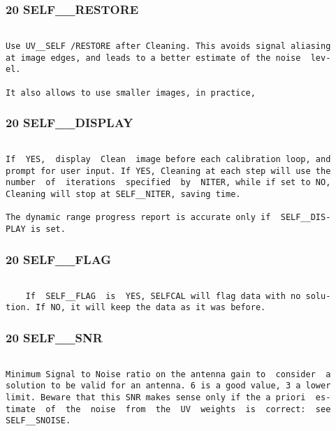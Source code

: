 \subsubsection{20 SELF\_\_RESTORE}
\begin{verbatim}

Use UV__SELF /RESTORE after Cleaning. This avoids signal aliasing
at image edges, and leads to a better estimate of the noise  lev-
el.

It also allows to use smaller images, in practice,

\end{verbatim}
\subsubsection{20 SELF\_\_DISPLAY}
\begin{verbatim}

If  YES,  display  Clean  image before each calibration loop, and
prompt for user input. If YES, Cleaning at each step will use the
number  of  iterations  specified  by  NITER, while if set to NO,
Cleaning will stop at SELF__NITER, saving time.

The dynamic range progress report is accurate only if  SELF__DIS-
PLAY is set.

\end{verbatim}
\subsubsection{20 SELF\_\_FLAG}
\begin{verbatim}

    If  SELF__FLAG  is  YES, SELFCAL will flag data with no solu-
tion. If NO, it will keep the data as it was before.

\end{verbatim}
\subsubsection{20 SELF\_\_SNR}
\begin{verbatim}

Minimum Signal to Noise ratio on the antenna gain to  consider  a
solution to be valid for an antenna. 6 is a good value, 3 a lower
limit. Beware that this SNR makes sense only if the a priori  es-
timate  of  the  noise  from  the  UV  weights  is  correct:  see
SELF__SNOISE.

\end{verbatim}
